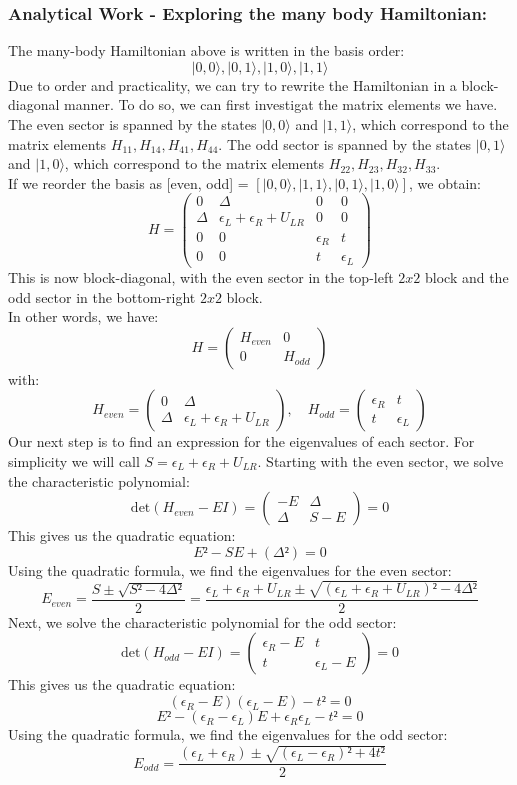 \documentclass[11pt, letterpaper, titlepage]{article}
\begin{document}
\subsubsection{Analytical Work - Exploring the many body Hamiltonian:} 
The many-body Hamiltonian above is written in the basis order:
$$ |0,0⟩, |0,1⟩, |1,0⟩, |1,1⟩ $$
Due to order and practicality, we can try to rewrite the Hamiltonian in a block-diagonal manner. To do so, we can first investigat the matrix elements we have. The even sector is spanned by the states $|0,0⟩$ and $|1,1⟩$, which correspond to the matrix elements $H_{11}, H_{14}, H_{41}, H_{44}$. The odd sector is spanned by the states $|0,1⟩$ and $|1,0⟩$, which correspond to the matrix elements $H_{22}, H_{23}, H_{32}, H_{33}$.\\
If we reorder the basis as [even, odd] = $[|0,0⟩, |1,1⟩, |0,1⟩, |1,0⟩]$, we obtain:
$$
H = \begin{pmatrix}
0 & Δ & 0 & 0 \\
Δ & ϵ_L + ϵ_R + U_{LR} & 0 & 0 \\
0 & 0 & ϵ_R & t \\
0 & 0 & t & ϵ_L
\end{pmatrix}
$$
This is now block-diagonal, with the even sector in the top-left $2x2$ block and the odd sector in the bottom-right $2x2$ block.\\
In other words, we have:
$$
H = \begin{pmatrix}
H_{even} & 0 \\
0 & H_{odd}
\end{pmatrix}
$$
with:
$$
H_{even} = \begin{pmatrix}
0 & Δ \\
Δ & ϵ_L + ϵ_R + U_{LR}
\end{pmatrix}, \quad
H_{odd} = \begin{pmatrix}
ϵ_R & t \\
t & ϵ_L
\end{pmatrix}
$$
Our next step is to find an expression for the eigenvalues of each sector. For simplicity we will call $S = ϵ_L + ϵ_R + U_{LR}$. Starting with the even sector, we solve the characteristic polynomial:
$$
\text{det}(H_{even} - EI) = \begin{pmatrix}
    -E & Δ \\
    Δ & S - E
\end{pmatrix} =0
$$
This gives us the quadratic equation:
$$
E² - SE + (Δ²) = 0
$$
Using the quadratic formula, we find the eigenvalues for the even sector:
$$E_{even} = \frac{S ± \sqrt{S² - 4Δ²}}{2} = \frac{ϵ_L + ϵ_R + U_{LR} ± \sqrt{(ϵ_L + ϵ_R + U_{LR})² - 4Δ²}}{2}$$
Next, we solve the characteristic polynomial for the odd sector:
$$
\text{det}(H_{odd} - EI) = \begin{pmatrix}
    ϵ_R - E & t \\
    t & ϵ_L - E
\end{pmatrix} =0
$$
This gives us the quadratic equation:
$$(ϵ_R-E)(ϵ_L - E)  - t² = 0$$
$$E² -(ϵ_R-ϵ_L)E + ϵ_R ϵ_L - t² = 0$$
Using the quadratic formula, we find the eigenvalues for the odd sector:
$$E_{odd} = \frac{(ϵ_L + ϵ_R) ± \sqrt{(ϵ_L - ϵ_R)² + 4t²}}{2}$$
\end{document}
